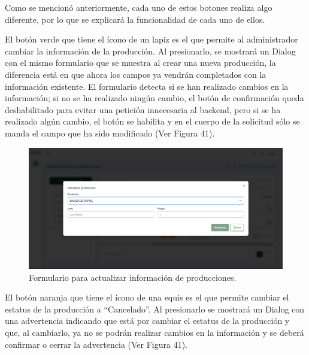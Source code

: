 Como se mencionó anteriormente, cada uno de estos botones realiza algo diferente, por lo que se explicará la funcionalidad de cada uno de ellos.

El botón verde que tiene el ícono de un lapiz es el que permite al administrador cambiar la información de la producción. Al presionarlo, se mostrará un Dialog con el mismo formulario que se muestra al crear una nueva producción, la diferencia está en que ahora los campos ya vendrán completados con la información existente. El formulario detecta si se han realizado cambios en la información; si no se ha realizado ningún cambio, el botón de confirmación queda deshabilitado para evitar una petición innecesaria al backend, pero si se ha realizado algún cambio, el botón se habilita y en el cuerpo de la solicitud sólo se manda el campo que ha sido modificado (Ver Figura 41).

    \begin{figure}[H]
        \begin{center}
            \includegraphics[scale=0.33]{img/actividades/producciones/formulario-update.png}
            \caption{Formulario para actualizar información de producciones.}
            \label{fig:formulario-update}
        \end{center}
    \end{figure}

El botón naranja que tiene el ícono de una equis es el que permite cambiar el estatus de la producción a ``Cancelado''. Al presionarlo se mostrará un Dialog con una advertencia indicando que está por cambiar el estatus de la producción y que, al cambiarlo, ya no se podrán realizar cambios en la información y se deberá confirmar o cerrar la advertencia (Ver Figura 41).

